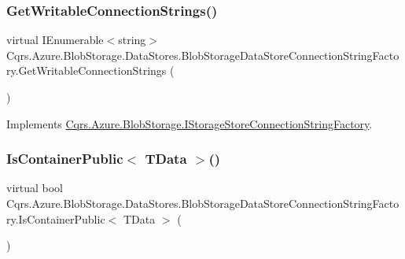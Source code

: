 \subsubsection{\texorpdfstring{Get\+Writable\+Connection\+Strings()}{GetWritableConnectionStrings()}}
{\footnotesize\ttfamily virtual I\+Enumerable$<$string$>$ Cqrs.\+Azure.\+Blob\+Storage.\+Data\+Stores.\+Blob\+Storage\+Data\+Store\+Connection\+String\+Factory.\+Get\+Writable\+Connection\+Strings (\begin{DoxyParamCaption}{ }\end{DoxyParamCaption})\hspace{0.3cm}{\ttfamily [virtual]}}



Implements \hyperlink{interfaceCqrs_1_1Azure_1_1BlobStorage_1_1IStorageStoreConnectionStringFactory_a26ecfd0805fe3d525e9fa419330bd140}{Cqrs.\+Azure.\+Blob\+Storage.\+I\+Storage\+Store\+Connection\+String\+Factory}.

\mbox{\label{classCqrs_1_1Azure_1_1BlobStorage_1_1DataStores_1_1BlobStorageDataStoreConnectionStringFactory_a96e368a2b00f9614eff6ca4bcdeb3a24}} 
\subsubsection{\texorpdfstring{Is\+Container\+Public$<$ T\+Data $>$()}{IsContainerPublic< TData >()}}
{\footnotesize\ttfamily virtual bool Cqrs.\+Azure.\+Blob\+Storage.\+Data\+Stores.\+Blob\+Storage\+Data\+Store\+Connection\+String\+Factory.\+Is\+Container\+Public$<$ T\+Data $>$ (\begin{DoxyParamCaption}{ }\end{DoxyParamCaption})\hspace{0.3cm}{\ttfamily [virtual]}}



